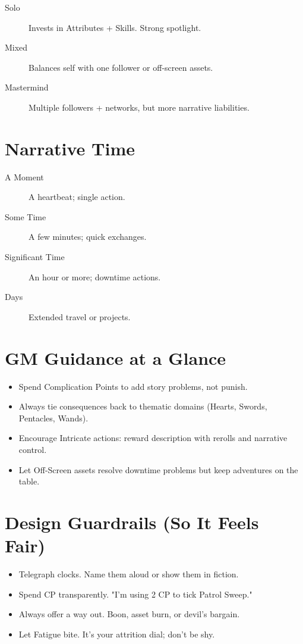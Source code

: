 \begin{description}
\item[Solo] Invests in Attributes + Skills. Strong spotlight.
\item[Mixed] Balances self with one follower or off-screen assets.
\item[Mastermind] Multiple followers + networks, but more narrative liabilities.
\end{description}

\section{Narrative Time}

\begin{description}
\item[A Moment] A heartbeat; single action.
\item[Some Time] A few minutes; quick exchanges.
\item[Significant Time] An hour or more; downtime actions.
\item[Days] Extended travel or projects.
\end{description}

\section{GM Guidance at a Glance}

\begin{itemize}
\item Spend Complication Points to add story problems, not punish.
\item Always tie consequences back to thematic domains (Hearts, Swords, Pentacles, Wands).
\item Encourage Intricate actions: reward description with rerolls and narrative control.
\item Let Off-Screen assets resolve downtime problems but keep adventures on the table.
\end{itemize}

\section{Design Guardrails (So It Feels Fair)}

\begin{itemize}
\item Telegraph clocks. Name them aloud or show them in fiction.
\item Spend CP transparently. "I'm using 2 CP to tick Patrol Sweep."
\item Always offer a way out. Boon, asset burn, or devil's bargain.
\item Let Fatigue bite. It's your attrition dial; don't be shy.
\end{itemize}

